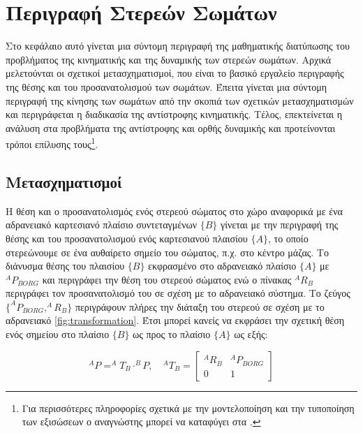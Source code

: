 \chapter{Περιγραφή Στερεών Σωμάτων}

Στο κεφάλαιο αυτό γίνεται μια σύντομη περιγραφή της μαθηματικής διατύπωσης του προβλήματος της κινηματικής και της δυναμικής των στερεών σωμάτων. Αρχικά μελετούνται οι σχετικοί μετασχηματισμοί, που είναι το βασικό εργαλείο περιγραφής της θέσης και του προσανατολισμού των σωμάτων. Έπειτα γίνεται μια σύντομη περιγραφή της κίνησης των σωμάτων από την σκοπιά των σχετικών μετασχηματισμών και περιγράφεται η διαδικασία της αντίστροφης κινηματικής. Τέλος, επεκτείνεται η ανάλυση στα προβλήματα της αντίστροφης και ορθής δυναμικής και προτείνονται τρόποι επίλυσης τους\footnote{Για περισσότερες πληροφορίες σχετικά με την μοντελοποίηση και την τυποποίηση των εξισώσεων ο αναγνώστης μπορεί να καταφύγει στα \cite{craig95, murray94}.}.

\section{Μετασχηματισμοί}

Η θέση και ο προσανατολισμός ενός στερεού σώματος στο χώρο αναφορικά με ένα αδρανειακό καρτεσιανό πλαίσιο συντεταγμένων $\{Β\}$ γίνεται με την περιγραφή της θέσης και του προσανατολισμού ενός καρτεσιανού πλαισίου $\{Α\}$, το οποίο στερεώνουμε σε ένα αυθαίρετο σημείο του σώματος, π.χ. στο κέντρο μάζας. Το διάνυσμα θέσης του πλαισίου $\{Β\}$ εκφρασμένο στο αδρανειακό πλαίσιο $\{Α\}$ με $^AP_{BORG}$ και περιγράφει την θέση του στερεού σώματος ενώ ο πίνακας $^AR_B$ περιγράφει τον προσανατολισμό του σε σχέση με το αδρανειακό σύστημα. Το ζεύγος $\{^AP_{BORG}, ^AR_B\}$ περιγράφουν πλήρες την διάταξη του στερεού σε σχέση με το αδρανειακό \ref{fig:transformation}. Έτσι μπορεί κανείς να εκφράσει την σχετική θέση ενός σημείου στο πλαίσιο $\{Β\}$ ως προς το πλαίσιο  $\{Α\}$ ως εξής:

\begin{equation}
    ^AP = ^AT_B \cdot ^BP, \quad
    ^AT_B =
    \begin{bmatrix}
        ^AR_B & ^AP_{BORG}\\
        0 & 1
    \end{bmatrix}
\end{equation}

